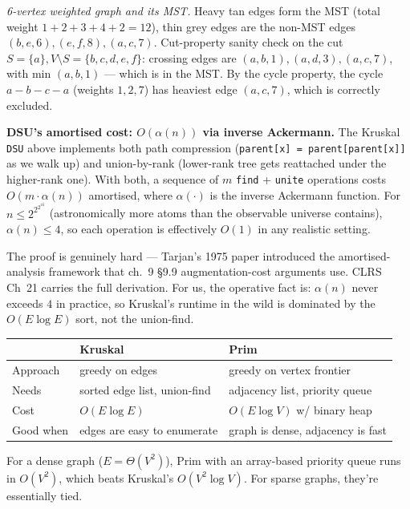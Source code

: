\documentclass[11pt]{article}
\begin{document}
\emph{6-vertex weighted graph and its MST.} Heavy tan edges form
the MST (total weight $1{+}2{+}3{+}4{+}2 = 12$), thin grey edges
are the non-MST edges $(b,e,6), (e,f,8), (a,c,7)$. Cut-property
sanity check on the cut
$S = \{a\}, V \setminus S = \{b, c, d, e, f\}$: crossing edges are
$(a,b,1), (a,d,3), (a,c,7)$, with min $(a,b,1)$ --- which is in the
MST. By the cycle property, the cycle
$a{-}b{-}c{-}a$ (weights $1, 2, 7$) has heaviest edge $(a,c,7)$,
which is correctly excluded.

\begin{notebox}
\textbf{DSU's amortised cost: $O(\alpha(n))$ via inverse Ackermann.}
The Kruskal \texttt{DSU} above implements both path compression
(\texttt{parent[x] = parent[parent[x]]} as we walk up) and
union-by-rank (lower-rank tree gets reattached under the
higher-rank one). With both, a sequence of $m$ \texttt{find} +
\texttt{unite} operations costs
$O(m \cdot \alpha(n))$ amortised, where $\alpha(\cdot)$ is the
inverse Ackermann function. For $n \le 2^{2^{2^{16}}}$
(astronomically more atoms than the observable universe contains),
$\alpha(n) \le 4$, so each operation is effectively $O(1)$ in any
realistic setting.

The proof is genuinely hard --- Tarjan's 1975 paper introduced the
amortised-analysis framework that ch.~9 \S9.9 augmentation-cost
arguments use. CLRS Ch~21 carries the full derivation. For us, the
operative fact is: $\alpha(n)$ never exceeds $4$ in practice, so
Kruskal's runtime in the wild is dominated by the
$O(E \log E)$ sort, not the union-find.
\end{notebox}

\begin{center}
\begin{tabular}{lll}
\hline
& Kruskal & Prim \\
\hline
Approach & greedy on edges & greedy on vertex frontier \\
Needs & sorted edge list, union-find & adjacency list, priority queue \\
Cost & $O(E \log E)$ & $O(E \log V)$ w/ binary heap \\
Good when & edges are easy to enumerate & graph is dense, adjacency is fast \\
\hline
\end{tabular}
\end{center}

\begin{notebox}
For a dense graph ($E = \Theta(V^2)$), Prim with an array-based priority queue runs in $O(V^2)$, which beats Kruskal's $O(V^2 \log V)$. For sparse graphs, they're essentially tied.
\end{notebox}
\end{document}
